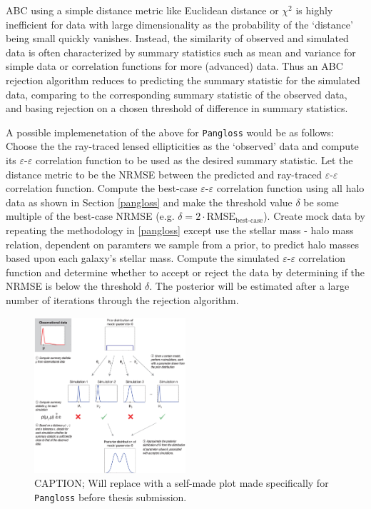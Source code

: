 \documentclass[%
 reprint,
 amsmath,amssymb,
 aps,nofootinbib
]{revtex4-1}
\begin{document}
ABC using a simple distance metric like Euclidean distance or $\chi^2$ is highly inefficient for data with large dimensionality as the probability of the `distance' being small quickly vanishes. Instead, the similarity of observed and simulated data is often characterized by summary statistics such as mean and variance for simple data or correlation functions for more (advanced) data. Thus an ABC rejection algorithm reduces to predicting the summary statistic for the simulated data, comparing to the corresponding summary statistic of the observed data, and basing rejection on a chosen threshold of difference in summary statistics.

A possible implemenetation of the above for \texttt{Pangloss} would be as follows: Choose the the ray-traced lensed ellipticities as the `observed' data and compute its $\varepsilon$-$\varepsilon$ correlation function to be used as the desired summary statistic. Let the distance metric to be the NRMSE between the predicted and ray-traced $\varepsilon$-$\varepsilon$ correlation function. Compute the best-case $\varepsilon$-$\varepsilon$ correlation function using all halo data as shown in Section \ref{pangloss} and make the threshold value $\delta$ be some multiple of the best-case NRMSE (e.g. ${\delta=2\cdot\text{RMSE}_{\text{best-case}}}$). Create mock data by repeating the methodology in \ref{pangloss} except use the stellar mass - halo mass relation, dependent on paramters we sample from a prior, to predict halo masses based upon each galaxy's stellar mass. Compute the simulated $\varepsilon$-$\varepsilon$ correlation function and determine whether to accept or reject the data by determining if the NRMSE is below the threshold $\delta$. The posterior will be estimated after a large number of iterations through the rejection algorithm.

\begin{figure}
    \centering
    \includegraphics[width=0.5\textwidth]{figs-swe/thesis/abc.png}
    \captionsetup{justification=raggedright,singlelinecheck=false}
    \caption{CAPTION; Will replace with a self-made plot made specifically for \texttt{Pangloss} before thesis submission.}
    \label{fig:abc}
\end{figure}
\end{document}
